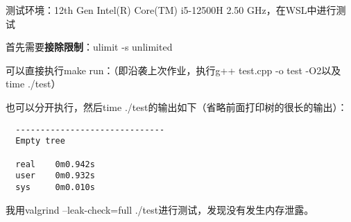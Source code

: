 \documentclass[UTF8]{ctexart}
\begin{document}
测试环境：12th Gen Intel(R) Core(TM) i5-12500H   2.50 GHz，在WSL中进行测试

首先需要\textbf{接除限制}：ulimit -s unlimited

可以直接执行make run：（即沿袭上次作业，执行g++ test.cpp -o test -O2以及time ./test）

也可以分开执行，然后time ./test的输出如下（省略前面打印树的很长的输出）：
\begin{verbatim}
  ------------------------------
  Empty tree

  real    0m0.942s
  user    0m0.932s
  sys     0m0.010s
\end{verbatim}

我用valgrind --leak-check=full ./test进行测试，发现没有发生内存泄露。
\end{document}
